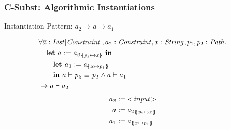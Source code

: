 \begin{frame}[t]
\frametitle{C-Subst: Algorithmic Instantiations}
Instantiation Pattern: $a_2 \rightarrow a \rightarrow a_1$

\begin{align*}
&\forall \overline{a}: \mathit{List[\mathit{Constraint}]}, a_2: \mathit{Constraint}, x: \mathit{String}, p_1, p_2: \mathit{Path}.\\
&\quad \textbf{let } a := \mathit{a_2}_{\{\mskip-6.9mu\{ \mathit{p_2} \mapsto \mathit{x} \}\mskip-6.9mu\}}\ \textbf{in }\\
&\qquad \textbf{let } a_1 := \mathit{a}_{\{\mskip-6.9mu\{ \mathit{x} \mapsto \mathit{p_1} \}\mskip-6.9mu\}}\\
&\qquad \textbf{in }
        \overline{a} \vdash \mathit{p_2} \equiv \mathit{p_1}
        \land
        \overline{a} \vdash a_1\\
&\rightarrow \overline{a} \vdash a_2
\end{align*}
%
\begin{align*}
a_2 &:= \mIt{<\!input\!>}\\
a &:= {a_2}_{\sub{p_2}{x}}\\
a_1 &:= a_{\sub{x}{p_1}}
\end{align*}
\end{frame}
